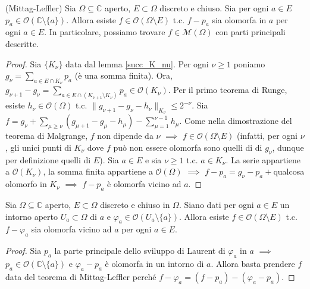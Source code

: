 \begin{thm}
  (Mittag-Leffler) Sia $\Omega \subseteq \mathbb{C}$ aperto, $E \subset \Omega$ discreto e chiuso. Sia per ogni $a \in E$ $p_a \in \mathcal{O}(\mathbb{C}\setminus\{a\})$. Allora esiste $f \in \mathcal{O}(\Omega\setminus E)$ t.c. $f-p_a$ sia olomorfa in $a$ per ogni $a \in E$. In particolare, possiamo trovare $f \in \mathcal{M}(\Omega)$ con parti principali descritte.
\end{thm}

\begin{proof}
  Sia $\{K_{\nu}\}$ data dal lemma \ref{succ_K_nu}. Per ogni $\nu \ge 1$ poniamo $\displaystyle g_{\nu}=\sum_{a \in E \cap K_{\nu}} p_a$ (è una somma finita).
  Ora, $\displaystyle g_{\nu+1}-g_{\nu}=\sum_{a \in E \cap (K_{\nu+1}\setminus K_{\nu})} p_a \in \mathcal{O}(K_{\nu})$.
  Per il primo teorema di Runge, esiste $h_{\nu} \in \mathcal{O}(\Omega)$ t.c. $\|g_{\nu+1}-g_{\nu}-h_{\nu}\|_{K_{\nu}} \le 2^{-\nu}$.
  Sia $\displaystyle f=g_{\nu}+\sum_{\mu \ge \nu} (g_{\mu+1}-g_{\mu}-h_{\mu})-\sum_{\mu=1}^{\nu-1} h_{\mu}$.
  Come nella dimostrazione del teorema di Malgrange, $f$ non dipende da $\nu$ $\implies$ $f \in \mathcal{O}(\Omega\setminus E)$ (infatti, per ogni $\nu$, gli unici punti di $K_{\nu}$ dove $f$ può non essere olomorfa sono quelli di di $g_{\nu}$, dunque per definizione quelli di $E$).
  Sia $a \in E$ e sia $\nu \ge 1$ t.c. $a \in K_{\nu}$. La serie appartiene a $\mathcal{O}(K_{\nu})$, la somma finita appartiene a $\mathcal{O}(\Omega)$ $\implies$ $f-p_a=g_{\nu}-p_a+$qualcosa olomorfo in $K_{\nu}$ $\implies$ $f-p_a$ è olomorfa vicino ad $a$.
\end{proof}

\begin{cor}
  Sia $\Omega \subseteq \mathbb{C}$ aperto, $E \subset \Omega$ discreto e chiuso in $\Omega$. Siano dati per ogni $a \in E$ un intorno aperto $U_a \subset \Omega$ di $a$ e $\varphi_a \in \mathcal{O}(U_a \setminus \{a\})$. Allora esiste $f \in \mathcal{O}(\Omega\setminus E)$ t.c. $f-\varphi_a$ sia olomorfa vicino ad $a$ per ogni $a \in E$.
\end{cor}

\begin{proof}
  Sia $p_a$ la parte principale dello sviluppo di Laurent di $\varphi_a$ in $a$ $\implies$ $p_a \in \mathcal{O}(\mathbb{C}\setminus \{a\})$ e $\varphi_a-p_a$ è olomorfa in un intorno di $a$. Allora basta prendere $f$ data del teorema di Mittag-Leffler perché $f-\varphi_a=(f-p_a)-(\varphi_a-p_a)$.
\end{proof}

